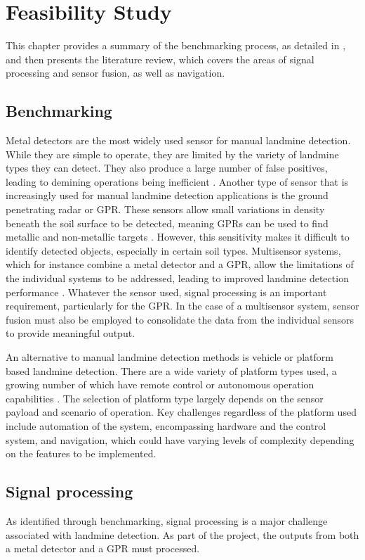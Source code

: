 \documentclass[main.tex]{subfiles}
\begin{document}
\chapter{Feasibility Study}
This chapter provides a summary of the benchmarking process, as detailed in , and then presents the literature review, which covers the areas of signal processing and sensor fusion, as well as navigation.

\section{Benchmarking}
Metal detectors are the most widely used sensor for manual landmine detection. While they are simple to operate, they are limited by the variety of landmine types they can detect. They also produce a large number of false positives, leading to demining operations being inefficient \parencite{minelabF3}. Another type of sensor that is increasingly used for manual landmine detection applications is the ground penetrating radar or GPR. These sensors allow small variations in density beneath the soil surface to be detected, meaning GPRs can be used to find metallic and non-metallic targets \parencite{sakaguchi2014}. However, this sensitivity makes it difficult to identify detected objects, especially in certain soil types. Multisensor systems, which for instance combine a metal detector and a GPR, allow the limitations of the individual systems to be addressed, leading to improved landmine detection performance \parencite{Takahashi10}. Whatever the sensor used, signal processing is an important requirement, particularly for the GPR. In the case of a multisensor system, sensor fusion must also be employed to consolidate the data from the individual sensors to provide meaningful output.  

An alternative to manual landmine detection methods is vehicle or platform based landmine detection. There are a wide variety of platform types used, a growing number of which have remote control or autonomous operation capabilities \parencite{portugal2014}. The selection of platform type largely depends on the sensor payload and scenario of operation. Key challenges regardless of the platform used include automation of the system, encompassing hardware and the control system, and navigation, which could have varying levels of complexity depending on the features to be implemented. 

\section{Signal processing}
As identified through benchmarking, signal processing is a major challenge associated with landmine detection. As part of the project, the outputs from both a metal detector and a GPR must processed. 
\end{document}
